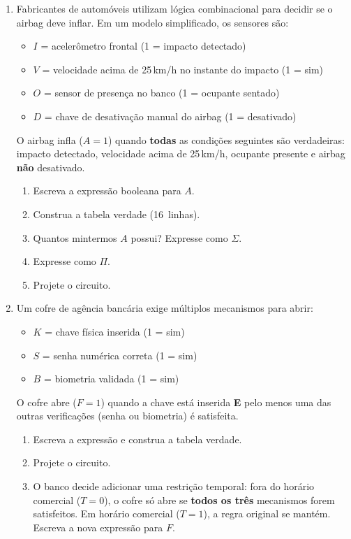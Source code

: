 \documentclass[11pt, a4paper]{article}
\begin{document}
\begin{enumerate}
\newpage
\item Fabricantes de autom\'{o}veis utilizam l\'{o}gica combinacional para decidir se o airbag deve inflar. Em um modelo simplificado, os sensores s\~{a}o:
\begin{itemize}
  \item $I$ = aceler\^{o}metro frontal (1 = impacto detectado)
  \item $V$ = velocidade acima de 25\,km/h no instante do impacto (1 = sim)
  \item $O$ = sensor de presen\c{c}a no banco (1 = ocupante sentado)
  \item $D$ = chave de desativa\c{c}\~{a}o manual do airbag (1 = desativado)
\end{itemize}
O airbag infla ($A = 1$) quando \textbf{todas} as condi\c{c}\~{o}es seguintes s\~{a}o verdadeiras: impacto detectado, velocidade acima de 25\,km/h, ocupante presente e airbag \textbf{n\~{a}o} desativado.
\begin{enumerate}
  \item Escreva a express\~{a}o booleana para $A$.
  \item Construa a tabela verdade (16~linhas).
  \item Quantos mintermos $A$ possui? Expresse como $\Sigma$.
  \item Expresse como $\Pi$.
  \item Projete o circuito.
\end{enumerate}

\item Um cofre de ag\^{e}ncia banc\'{a}ria exige m\'{u}ltiplos mecanismos para abrir:
\begin{itemize}
  \item $K$ = chave f\'{i}sica inserida (1 = sim)
  \item $S$ = senha num\'{e}rica correta (1 = sim)
  \item $B$ = biometria validada (1 = sim)
\end{itemize}
O cofre abre ($F = 1$) quando a chave est\'{a} inserida \textbf{E} pelo menos uma das outras verifica\c{c}\~{o}es (senha ou biometria) \'{e} satisfeita.
\begin{enumerate}
  \item Escreva a express\~{a}o e construa a tabela verdade.
  \item Projete o circuito.
  \item O banco decide adicionar uma restri\c{c}\~{a}o temporal: fora do hor\'{a}rio comercial ($T=0$), o cofre s\'{o} abre se \textbf{todos os tr\^{e}s} mecanismos forem satisfeitos. Em hor\'{a}rio comercial ($T=1$), a regra original se mant\'{e}m. Escreva a nova express\~{a}o para $F$.
\end{enumerate}


\end{enumerate}
\end{document}
